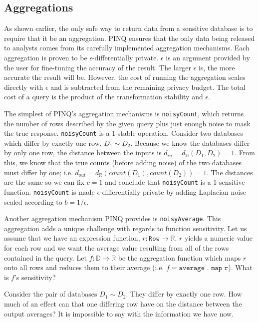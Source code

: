 \documentclass[12pt]{report}
\begin{document}
\subsection{Aggregations}

As shown earlier, the only safe way to return data from a sensitive database is to require that it be an aggregation.
PINQ ensures that the only data being released to analysts comes from its carefully implemented aggregation mechanisms.
Each aggregation is proven to be $\epsilon$-differentially private.
$\epsilon$ is an argument provided by the user for fine-tuning the accuracy of the result.
The larger $\epsilon$ is, the more accurate the result will be.
However, the cost of running the aggregation scales directly with $\epsilon$ and is subtracted from the remaining privacy budget.
The total cost of a query is the product of the transformation stability and $\epsilon$.

The simplest of PINQ's aggregation mechanisms is \texttt{noisyCount}, which returns the number of rows described by the given query plus just enough noise to mask the true response.
\texttt{noisyCount} is a 1-stable operation.
Consider two databases which differ by exactly one row, $D_1 \sim D_2$.
Because we know the databases differ by only one row, the distance between the inputs is $d_{in} = d_{\mathbb D}(D_1,D_2)=1$.
From this, we know that the true counts (before adding noise) of the two databases must differ by one; i.e. $d_{out} = d_{\mathbb R}(count(D_1),count(D_2))=1$.
The distances are the same so we can fix $c=1$ and conclude that \texttt{noisyCount} is a 1-sensitive function.
\texttt{noisyCount} is made $\epsilon$-differentially private by adding Laplacian noise scaled according to $b=1/\epsilon$.

Another aggregation mechanism PINQ provides is \texttt{noisyAverage}.
This aggregation adds a unique challenge with regards to function sensitivity.
Let us assume that we have an expression function, $r : \texttt{Row} \rightarrow \mathbb R$.
$r$ yields a numeric value for each row and we want the average value resulting from all of the rows contained in the query.
Let $f : \mathbb D \rightarrow \mathbb R$ be the aggregation function which maps $r$ onto all rows and reduces them to their average (i.e. $f = \texttt{average . map r}$).
What is $f$'s sensitivity?

Consider the pair of databases $D_1 \sim D_2$.
They differ by exactly one row.
How much of an effect can that one differing row have on the distance between the output averages?
It is impossible to say with the information we have now.
\end{document}
